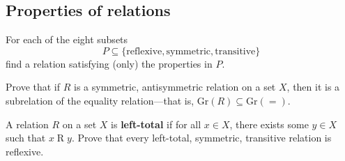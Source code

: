 \subsection*{Properties of relations}

\begin{chapex}
For each of the eight subsets
$$P \subseteq \{ \text{reflexive}, \text{symmetric}, \text{transitive} \}$$
find a relation satisfying (only) the properties in $P$.
\end{chapex}

\begin{chapex}
Prove that if $R$ is a symmetric, antisymmetric relation on a set $X$, then it is a subrelation of the equality relation---that is, $\mathrm{Gr}(R) \subseteq \mathrm{Gr}(=)$.
\end{chapex}

\begin{chapex}
A relation $R$ on a set $X$ is \textbf{left-total} if for all $x \in X$, there exists some $y \in X$ such that $x \mathbin{R} y$. Prove that every left-total, symmetric, transitive relation is reflexive.
\end{chapex}













